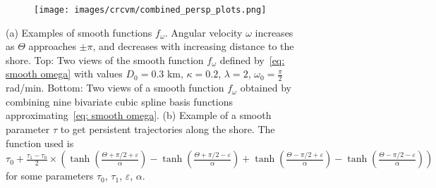 \documentclass[aoas]{imsart}
\theoremstyle{definition}
\theoremstyle{remark}
\theoremstyle{remark}
\newcommand {\1}{\mathbb{1}}
\begin{document}
\begin{figure}[ht!]
	\centering
	\begin{subfigure}{0.48\textwidth}
		\texttt{[image: images/crcvm/combined\_persp\_plots.png]}
		\caption{}
		\label{fig: combinedperspplots}
	\end{subfigure}
	\begin{subfigure}{0.48\textwidth}
		\centering
		\caption{}
		\label{fig: smoothtau}
	\end{subfigure}
\caption{(a) Examples of smooth functions $f_{\omega}$. Angular velocity $\omega$ increases as $\Theta$ approaches $\pm\pi$, and decreases with increasing distance to the shore.  Top: Two views of the smooth function $f_{\omega}$ defined by~\eqref{eq: smooth omega} with values $D_0=0.3$ km, $\kappa=0.2$, $\lambda=2$, $\omega_0=\frac{\pi}{2}$ rad/min. Bottom: Two views of a smooth function $f_{\omega}$ obtained by combining nine bivariate cubic spline basis functions approximating~\eqref{eq: smooth omega}. (b) Example of a smooth parameter $\tau$ to get persistent trajectories along the shore. The function used is $\tau_0+\frac{\tau_1-\tau_0}{2}\times \left(\tanh(\frac{\Theta+\pi/2+\varepsilon}{\alpha})-\tanh(\frac{\Theta+\pi/2-\varepsilon}{\alpha})+\tanh(\frac{\Theta-\pi/2+\varepsilon}{\alpha})-\tanh(\frac{\Theta-\pi/2-\varepsilon}{\alpha})\right)$ for some parameters $\tau_0$, $\tau_1$, $\varepsilon$, $\alpha$.}
	
\end{figure}
\end{document}

